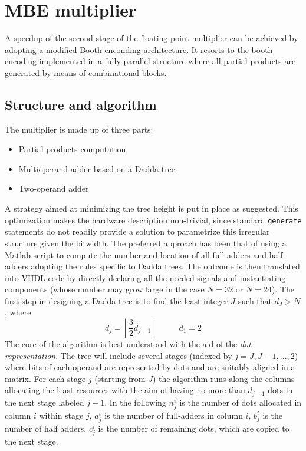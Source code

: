 \chapter{MBE multiplier}
A speedup of the second stage of the floating point multiplier can be achieved by adopting a modified Booth enconding architecture. It resorts to the booth encoding implemented in a fully parallel structure where all partial products are generated by means of combinational blocks. 
\section{Structure and algorithm}
The multiplier is made up of three parts:
\begin{itemize}
	\item Partial products computation
	\item Multioperand adder based on a Dadda tree
	\item Two-operand adder
\end{itemize}
A strategy aimed at minimizing the tree height is put in place as suggested.
This optimization makes the hardware description non-trivial, since standard \texttt{generate} statements do not readily provide a solution to parametrize this irregular structure given the bitwidth. 
The preferred approach has been that of using a Matlab script to compute the number and location of all full-adders and half-adders adopting the rules specific to Dadda trees. The outcome is then translated into VHDL code by directly declaring all the needed signals and instantiating components (whose number may grow large in the case $N=32$ or $N=24$).
The first step in designing a Dadda tree is to find the least integer $J$ such that $d_J > N$, where 
\begin{equation*}
d_j = \left \lfloor{\frac{3}{2}d_{j-1}}\right \rfloor \hspace{1cm}\,\,d_1 = 2
\end{equation*}
The core of the algorithm is best understood with the aid of the \textit{dot representation}. The tree will include several stages (indexed by $j=J, J-1, ..., 2$) where bits of each operand are represented by dots and are suitably aligned in a matrix. For each stage $j$ (starting from $J$) the algorithm runs along the columns allocating the least resources with the aim of having no more than $d_{j-1}$ dots in the next stage labeled $j-1$. In the following $n_j^i$ is the number of dots allocated in column $i$ within stage $j$, $a_j^i$ is the number of full-adders in column $i$, $b_j^i$ is the number of half adders, $c_j^i$ is the number of remaining dots, which are copied to the next stage.

